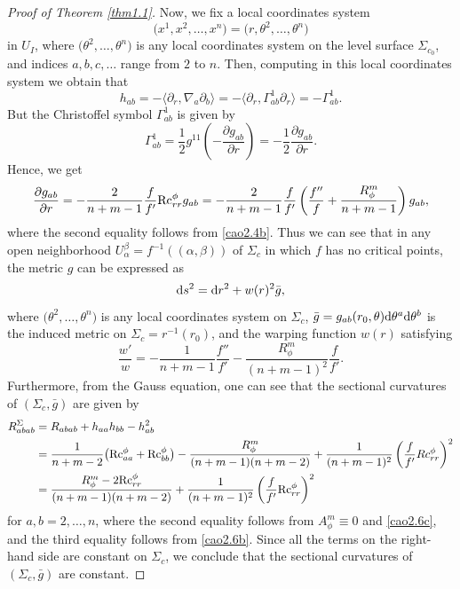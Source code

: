 \documentclass[pdftex]{sigma}
\numberwithin{equation}{section}
\begin{document}
\begin{proof}[Proof of Theorem \ref{thm1.1}]
Now, we fix a local coordinates system
\begin{equation*}
 \bigl(x^1,x^2,\dotsc,x^n\bigr)=\bigl(r,\theta^2,\dotsc,\theta^n\bigr)
\end{equation*}
in $U_I$, where $\bigl(\theta^2,\dotsc,\theta^n\bigr)$ is any local coordinates system on the level surface $\Sigma_{c_0}$, and indices $a,b,c,\dotsc$ range from $2$ to $n$. Then, computing in this local coordinates system we obtain that
\begin{equation*}
 h_{ab}=-\langle \partial_r,\nabla_a\partial_b\rangle=-\bigr\langle \partial_r,\Gamma_{ab}^1\partial_r\bigl\rangle =-\Gamma_{ab}^1.
\end{equation*}
But the Christoffel symbol $\Gamma_{ab}^1$ is given by
\begin{equation*}
 \Gamma_{ab}^1=\frac{1}{2}g^{11}\left(-\frac{\partial g_{ab}}{\partial r}\right)=-\frac{1}{2}\frac{\partial g_{ab}}{\partial r}.
\end{equation*}
Hence, we get
\begin{equation*}
 \frac{\partial g_{ab}}{\partial r}=-\frac{2}{n+m-1}\frac{f}{f'}{\rm Rc}^\phi_{rr}g_{ab}=-\frac{2}{n+m-1}\frac{f}{f'}\left(\frac{f''}{f}+\frac{R_\phi^m}{n+m-1}\right)g_{ab},
\end{equation*}
where the second equality follows from \eqref{cao2.4b}.
Thus we can see that in any open neighborhood $U_{\alpha}^\beta=f^{-1} ((\alpha,\beta) )$ of $\Sigma_c$ in which $f$ has no critical points, the metric $g$ can be expressed as
\begin{equation*}
 {\rm d}s^2={\rm d}r^2+w(r)^2\bar{g},
\end{equation*}
where $\bigl(\theta^2,\dots,\theta^n\bigr)$ is any local coordinates system on $\Sigma_c$, $\bar{g}=g_{ab}(r_0,\theta){\rm d}\theta^a{\rm d}\theta^b$ is the induced metric on $\Sigma_c=r^{-1}(r_0)$, and the warping function $w(r)$ satisfying
\begin{equation*}
 \frac{w'}{w}=-\frac{1}{n+m-1}\frac{f''}{f'}-\frac{R_\phi^m}{(n+m-1)^2}\frac{f}{f'}.
\end{equation*}
Furthermore, from the Gauss equation, one can see that the sectional curvatures of $(\Sigma_c,\bar{g})$ are given by
\begin{align*}
 R_{abab}^\Sigma&= R_{abab}+h_{aa}h_{bb}-h_{ab}^2\\
& = \frac{1}{n+m-2}\bigl({\rm Rc}^\phi_{aa}+{\rm Rc}^\phi_{bb}\bigr)-\frac{R_\phi^m}{(n+m-1)(n+m-2)}+\frac{1}{(n+m-1)^2}\left(\frac{f}{f'}Rc^\phi_{rr}\right)^2\\
& = \frac{R_\phi^m-2{\rm Rc}^\phi_{rr}}{(n+m-1)(n+m-2)}+\frac{1}{(n+m-1)^2}\left(\frac{f}{f'}{\rm Rc}^\phi_{rr}\right)^2
\end{align*}
for $a,b=2,\dots,n$, where the second equality follows from $A_\phi^m\equiv 0$ and \eqref{cao2.6c},
 and the third equality follows from \eqref{cao2.6b}. Since all the terms on the right-hand side are constant on $\Sigma_c$, we conclude that the sectional curvatures of $(\Sigma_c,\bar{g})$ are constant.
\end{proof}
\end{document}
